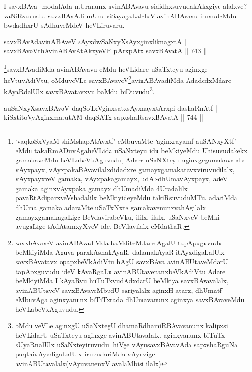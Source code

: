 \begin{artha}
I savxBAva- modalAda mUranunx avinABAvavu sididhxsuvudakAkxgiye alalxve? vaNiRsuvudu. savxBAvAdi mUru viSayagaLalelxV avinABAvavu iruvudeMdu bwdadhxrU sAdhuveMdeV heVLiruvaru.
\end{artha}


\begin{shl}
savxBAvAdavinABAveV sAyxdwSaNxyXsAyxginxliknagxtA | \\
savxBAvoV\s thAvinABAvAtAkxyeVR pArxpAtx savxBAvatA \hfill||  743 ||  
\end{shl}

\begin{artha}
\footnote{`vaqkoSxV\s yaM shiMshapAtAvxtf' eMbuvaMte `aginxrayamf auSANxyXtf' eMdu takaRmADuvAgaheVLida uSaNxteyu idu beMkiyeMdu Uhisuvudakekx gamakaveMdu heVLabeVkAguvudu, Adare uSaNXteyu aginxgegamakavalalx vAyxpayx, vAyxpakaBAvavilalxdidadxre gamayxgamakatavxviruvudilalx, vAyxpayxveV gamaka, vAyxpakagamayx, udA:-dhUmavAyxpayx, adeV gamaka aginxvAyxpaka gamayx dhUmadiMda dUradalilx pavaRtAdiparxveVshadalilx beMkiyideyeMdu takiRsuvuduMTu. adariMda dhUma gamaka adaraMte uSaTxNxte gamakavenunxvahAgilalx gamayxgamakagaLige BeVdavirabeVku, ililx, ilalx, uSaNxveV beMki avugaLige tAdAtamxyXveV ide. BeVdavilalx eMdathaR.}savxBAvadiMda avinABAvavu eMdu heVLidare uSaTxteyu aginxge heVtuvAdiVtu, oMduveVLe savxBAvaveV\footnote{savxbAvaveV avinABAvadiMda baMditeMdare AgalU tapApxguvudu beMkiyiMda Aguva parxkAshakAyaR, dahanakAyaR itAyxdigaLalUlx savxBAvatavx opapxbeVkAdiVtu hAgU savxBAva avinABUtaveMdarU tapApxguvudu ideV kAyaRgaLu avinABUtavenanxbeVkAdiVtu Adare beMkiyiMda I kAyaRvu huTuTxvudAdxdarU beMkiya savxBAvavalalx, avinABUtaveV savxBAvaveMbudU sariyalalx aginxH atarx, dhUmatf' eMbuvAga aginxyanunx biTiTxrada dhUmavanunx aginxya savxBAvaveMdu heVLabeVkAguvudu.}avinABAvadiMda AdadedxMdare kAyaRdalUlx savxBAvatavxvu baMdu biDuvudu\footnote{oMdu veVLe aginxgU uSaNxtegU dhamaRdhamiRBAvavanunx kalipxsi heVLidarU uSaTxteyu aginxge avinABUtavalalx. aginxyanunx biTuTx sUyaRnalUlx uSaNxteyiruvudu, hiVge vAyusavxBAvavAda sapxshaRguNa paqthivAyxdigaLalUlx iruvudariMda vAyuvige avinABUtavalalx(vAyuvanenxV avalaMbisi ilalx)}.
\end{artha}


\begin{shl}
auSaNxyXsavxBAvoV daqSoTxV\s ginxsatxsAyxnayxtArx\s pi dashaRnAtf | \\
kiSxtitoVyAginxmarutAM daqSATx sapxshaRsavxBAvatA \hfill||  744 ||  
\end{shl}

